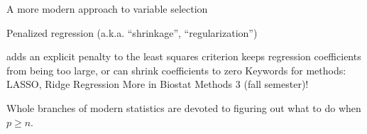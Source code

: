 
\begin{frame}{A more modern approach to variable selection}

\begin{block}{Penalized regression (a.k.a. ``shrinkage'', ``regularization'')} 

\bi
    \myitem adds an explicit penalty to the least squares criterion
	\myitem keeps regression coefficients from being too large, or can shrink coefficients to zero
    \myitem Keywords for methods: LASSO, Ridge Regression
    \myitem More in Biostat Methods 3 (fall semester)!
\ei
\end{block}

Whole branches of modern statistics are devoted to figuring out what to do when $p\geq n$. 

\end{frame}


